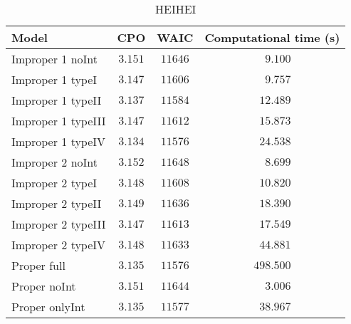 \begin{table}

\caption{\label{tab:CPO-results}HEIHEI}
\centering
\begin{tabular}{lccc}
\hline
Model  & CPO & WAIC & \multicolumn{1}{c}{Computational time (s)} \\ 
\hline
Improper 1 noInt  & $3.151$ & $11646$ & $\phantom{00}9.100$ \\
Improper 1 typeI  & $3.147$ & $11606$ & $\phantom{00}9.757$ \\
Improper 1 typeII  & $3.137$ & $11584$ & $\phantom{0}12.489$ \\
Improper 1 typeIII  & $3.147$ & $11612$ & $\phantom{0}15.873$ \\
Improper 1 typeIV  & $3.134$ & $11576$ & $\phantom{0}24.538$ \\
Improper 2 noInt  & $3.152$ & $11648$ & $\phantom{00}8.699$ \\
Improper 2 typeI  & $3.148$ & $11608$ & $\phantom{0}10.820$ \\
Improper 2 typeII  & $3.149$ & $11636$ & $\phantom{0}18.390$ \\
Improper 2 typeIII  & $3.147$ & $11613$ & $\phantom{0}17.549$ \\
Improper 2 typeIV  & $3.148$ & $11633$ & $\phantom{0}44.881$ \\
Proper full  & $3.135$ & $11576$ & $498.500$ \\
Proper noInt  & $3.151$ & $11644$ & $\phantom{00}3.006$ \\
Proper onlyInt  & $3.135$ & $11577$ & $\phantom{0}38.967$ \\
\hline 
\end{tabular}


\end{table}